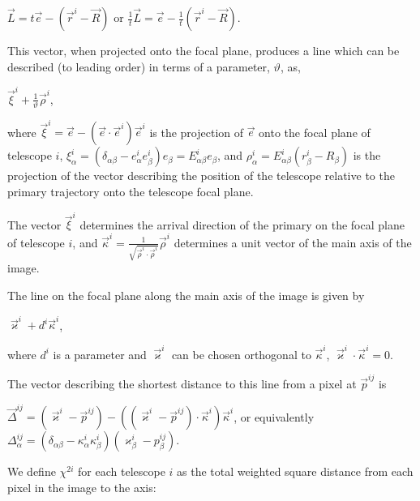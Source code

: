 \documentclass[letterpaper]{article}
\begin{document}
$\displaystyle \vec{L}=t\vec{e}-(\vec{r}^{i}-\vec{R})$ or 
$\displaystyle \frac{1}{t}\vec{L}=\vec{e}-\frac{1}{t}(\vec{r}^{i}-\vec{R})$.

This vector, when projected onto the focal plane, produces a line
which can be described (to leading order) in terms of a parameter,
$\vartheta$, as,

$\displaystyle \vec{\xi}^{i}+\frac{1}{\vartheta}\vec{\rho}^{i}$, 

where $\vec{\xi}^{i}=\vec{e}-(\vec{e}\cdot\vec{e}^{i})\vec{e}^{i}$ is the
projection of $\vec{e}$ onto the focal plane of telescope $i$,
$\xi_{\alpha }^{i}=(\delta_{\alpha\beta}-e_{\alpha}^{i}e_{\beta}^{i})
e_{\beta}= E_{\alpha\beta}^{i}e_{\beta}$, and $\displaystyle
\rho_{\alpha}^{i}= E_{\alpha\beta}^{i}(r_{\beta}^{i}-R_{\beta})$ is
the projection of the vector describing the position of the telescope
relative to the primary trajectory onto the telescope focal plane.

The vector $\vec{\xi}^{i}$ determines the arrival direction of the
primary on the focal plane of telescope $i$, and $\vec{\kappa}^{i}=
\frac{1}{\sqrt{\vec{\rho}^{i}\cdot\vec{\rho}^{i}}}\vec{\rho}^{i}$ 
determines a unit vector of the main axis of the image.

The line on the focal plane along the main axis of the image is
given by

$\displaystyle \vec{\varkappa}^{i}+d^{i}\vec{\kappa}^{i}$, 

where $d^{i}$ is a parameter and $\vec{\varkappa}^{i}$ can be chosen
orthogonal to $\vec{\kappa}^{i}$, 
$\vec{\varkappa}^{i}\cdot\vec{\kappa}^{i}=0$.

The vector describing the shortest distance to this line from a pixel at
$\vec{p}^{ij}$ is

$\displaystyle \vec{\Delta}^{ij}=
\left(\vec{\varkappa}^{i}-\vec{p}^{ij}\right) -
\left((\vec{\varkappa}^{i}-\vec{p}^{ij})\cdot\vec{\kappa}^{i}\right) 
\vec{\kappa}^{i}$, or equivalently $\Delta^{ij}_{\alpha}=
\left(\delta_{\alpha \beta }-\kappa_{\alpha}^{i}\kappa_{\beta }^{i}\right) 
\left(\varkappa_{\beta }^{i}-p_{\beta}^{ij}\right)$.

We define $\chi^{2i}$ for each telescope $i$ as the total weighted
square distance from each pixel in the image to the axis:
\end{document}
